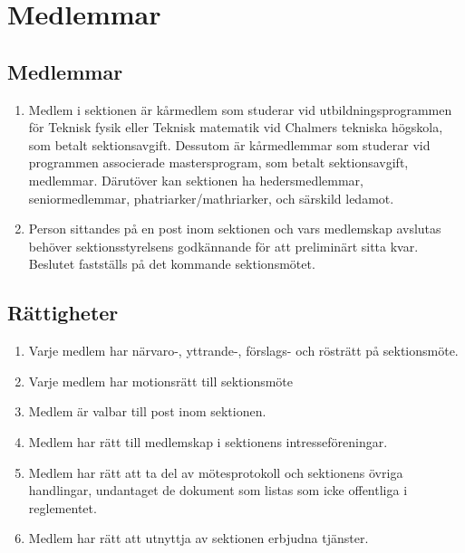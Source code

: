 \documentclass[11pt,a4paper]{article}
\begin{document}
\section{Medlemmar}
\subsection{Medlemmar}

\begin{enumerate}[\thesubsection .1]
   
   \item Medlem i sektionen är kårmedlem som studerar vid utbildningsprogrammen för Teknisk fysik eller Teknisk matematik vid Chalmers tekniska högskola, som betalt sektionsavgift. Dessutom är kårmedlemmar som studerar vid programmen associerade mastersprogram, som betalt sektionsavgift, medlemmar. Därutöver kan sektionen ha hedersmedlemmar, seniormedlemmar, phatriarker/mathriarker, och särskild ledamot.
   
   \item  Person sittandes på en post inom sektionen och vars medlemskap avslutas behöver sektionsstyrelsens godkännande för att preliminärt sitta kvar. Beslutet fastställs på det kommande sektionsmötet.
   
\end{enumerate}

\subsection{Rättigheter}

\begin{enumerate}[\thesubsection .1]

   \item Varje medlem har närvaro-, yttrande-, förslags- och rösträtt
   på sektionsmöte.
   
   \item Varje medlem har motionsrätt till sektionsmöte

   \item Medlem är valbar till post inom sektionen.

   \item Medlem har rätt till medlemskap i sektionens intresseföreningar.

   \item Medlem har rätt att ta del av mötesprotokoll och sektionens
   övriga handlingar, undantaget de dokument som listas som icke offentliga i reglementet. 
   \item Medlem har rätt att utnyttja av sektionen erbjudna tjänster.

\end{enumerate}
\end{document}
